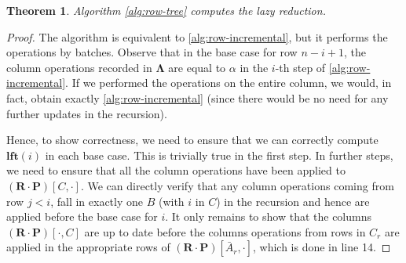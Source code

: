 \documentclass[10pt,a4paper]{article}
\newtheorem{theorem}{Theorem}[section]
\newcommand{\mat}[1]{\mathbf{#1}}
\newcommand{\lft}{\mathbf{lft}}
\begin{document}
\begin{theorem}
Algorithm \ref{alg:row-tree} computes the lazy reduction.
\end{theorem}
\begin{proof}
The algorithm is equivalent to \cref{alg:row-incremental}, but it performs the operations by batches. Observe that in the base case for row $n-i+1$, the column operations recorded in $\mat{\Lambda}$ are equal to $\alpha$ in the $i$-th step of \cref{alg:row-incremental}. If we performed the operations on the entire column, we would, in fact, obtain exactly \cref{alg:row-incremental} (since there would be no need for any further updates in the recursion). 

Hence, to show correctness, we need to ensure that we can correctly compute $\lft(i)$ in each base case. This is trivially true in the first step. In further steps, we need to ensure that all the column operations have been applied to $(\mat{R}\cdot \mat{P})[C,\cdot]$. We can directly verify that any column operations coming from row $j<i$, fall in exactly one $B$ (with $i$ in $C$) in the recursion and hence are applied before the base case for $i$.
%
It only remains to show that the columns $(\mat{R}\cdot \mat{P})[\cdot,C]$ are up to date before the columns operations from rows in $C_r$ are applied in the appropriate rows of $(\mat{R}\cdot \mat{P})[\bar{A}_r,\cdot]$, which is done in line 14. 
\end{proof}
\end{document}
